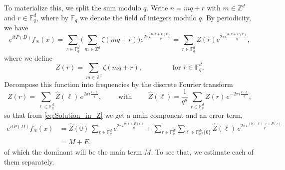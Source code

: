 \documentclass[11pt,reqno]{amsart}
\theoremstyle{definition}
\numberwithin{equation}{section}
\theoremstyle{remark}
\begin{document}
To materialize this, we split the sum modulo $q$. 
Write $n = mq+r$ with $m \in \mathbb Z^d$ and $r \in \mathbb F_q^d$, where by $\mathbb F_q$ we denote the field of integers modulo $q$. 
By periodicity, we have
\begin{equation}\label{eq:Solution_in_Z}
   e^{itP(D)}f_N(x)  
   =  \sum_{r \in \mathbb F_q^d} \Big( \sum_{m \in \mathbb Z^d}   \zeta(mq+r) \Big)  e^{2 \pi  i \frac{b \cdot r + P(r)}{q}}
   = \sum_{r \in \mathbb F_q^d} Z(r)  e^{2 \pi  i \frac{b \cdot r + P(r)}{q}},
\end{equation}
where we define 
\begin{equation}\label{eq:Def_Z}
    Z(r) = \sum_{m \in \mathbb Z^d}   \zeta(mq+r), \qquad  \qquad \text{ for } r \in \mathbb F_q^d. 
\end{equation}
Decompose this function into frequencies by the discrete Fourier transform
\begin{equation}\label{eq:DiscreteFT}
    Z(r) = \sum_{\ell \in \mathbb F_q^d} \widehat Z (\ell) \, e^{2\pi i \frac{r \cdot \ell}{q}}, 
    \qquad \text{ with } \qquad 
    \widehat Z (\ell) = \frac{1}{q^d} \,  \sum_{r  \in \mathbb F_q^d} Z(r) \, e^{-2\pi i \frac{r \cdot \ell}{q}}, 
\end{equation}
so that from \eqref{eq:Solution_in_Z} we get a main component and an error term, 
\begin{equation}
\begin{split}
    e^{itP(D)}f_N(x)
    & = \widehat Z(0) \,  \sum_{r \in \mathbb F_q^d}  e^{2 \pi  i \frac{b \cdot r + P(r)}{q}} 
    + 
    \sum_{r \in \mathbb F_q^d} \sum_{\ell \in \mathbb F_q^d \setminus \{ 0 \} } \widehat Z(\ell)  \,  e^{2 \pi  i \frac{(b + \ell) \cdot r + P(r)}{q}} \\
    & = M + E, 
    \end{split}
\end{equation}
of which the dominant will be the main term $M$. 
To see that, we estimate each of them separately.
\end{document}
